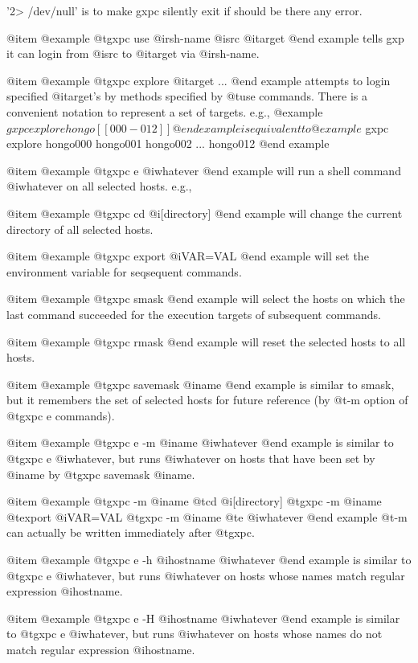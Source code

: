 '2> /dev/null' is to make gxpc silently exit if should be there any
error.

@item 
@example
@t{gxpc use} @i{rsh-name} @i{src} @i{target}
@end example
tells gxp it can login
from @i{src} to @i{target} via @i{rsh-name}. 

@item
@example
@t{gxpc explore} @i{target} ...
@end example
attempts to login specified @i{target}'s by methods specified by @t{use} 
commands.
There is a convenient notation to represent a set of targets. e.g.,
@example
$ gxpc explore hongo[[000-012]]
@end example
is equivalent to
@example
$ gxpc explore hongo000 hongo001 hongo002 ... hongo012
@end example

@item 
@example
@t{gxpc e} @i{whatever}
@end example
will run a shell command @i{whatever} on 
all selected hosts. e.g.,

@item 
@example
@t{gxpc cd} @i{[directory]}
@end example
will change the current directory of all selected hosts. 

@item 
@example
@t{gxpc export} @i{VAR=VAL}
@end example
will set the environment variable for seqsequent commands. 

@item 
@example
@t{gxpc smask}
@end example
will select the hosts on which the last command succeeded
for the execution targets of subsequent commands.

@item 
@example
@t{gxpc rmask}
@end example
will reset the selected hosts to all hosts.

@item 
@example
@t{gxpc savemask} @i{name}
@end example
is similar to smask, but it remembers the set of selected hosts
for future reference (by @t{-m} option of @t{gxpc e} commands).

@item 
@example
@t{gxpc e} -m @i{name} @i{whatever}
@end example
is similar to @t{gxpc e} @i{whatever}, but runs @i{whatever} on
hosts that have been set by @i{name} by @t{gxpc savemask} @i{name}.

@item 
@example
@t{gxpc -m} @i{name} @t{cd} @i{[directory]}
@t{gxpc -m} @i{name} @t{export} @i{VAR=VAL}
@t{gxpc -m} @i{name} @t{e} @i{whatever}
@end example
@t{-m} can actually be written immediately after @t{gxpc}.

@item 
@example
@t{gxpc e} -h @i{hostname} @i{whatever}
@end example
is similar to @t{gxpc e} @i{whatever}, but runs @i{whatever} on
hosts whose names match regular expression @i{hostname}. 

@item 
@example
@t{gxpc e} -H @i{hostname} @i{whatever}
@end example
is similar to @t{gxpc e} @i{whatever}, but runs @i{whatever} on
hosts whose names do not match regular expression @i{hostname}. 

